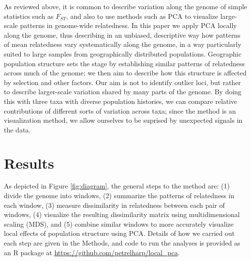 \documentclass[11pt, oneside]{article}   	%
\begin{document}
As reviewed above,
it is common to describe variation along the genome of simple statistics such as $F_{ST}$,
and also to use methods such as PCA to visualize large-scale patterns in genome-wide relatedness.
In this paper we 
apply PCA locally along the genome,
thus describing in an unbiased, descriptive way
how patterns of mean relatedness vary systematically along the genome, 
in a way particularly suited to large samples from geographically distributed populations.
Geographic population structure sets the stage by establishing similar patterns of relatedness across much of the genome;
we then aim to describe how this structure is affected by selection and other factors.
Our aim is not to identify outlier loci,
but rather to describe larger-scale variation shared by many parts of the genome.
By doing this with three taxa with diverse population histories,
we can compare relative contributions of different sorts of variation across taxa;
since the method is an visualization method, 
we allow ourselves to be suprised by unexpected signals in the data.


\section{Results}

As depicted in Figure \ref{fig:diagram}, the general steps to the method are:
(1) divide the genome into windows,
(2) summarize the patterns of relatedness in each window,
(3) measure dissimilarity in relatedness between each pair of windows,
(4) visualize the resulting dissimilarity matrix using multidimensional scaling (MDS),
and (5) combine similar windows to more accurately visualize local effects of population structure using PCA.
Details of how we carried out each step are given in the Methods,
and code to run the analyses is provided as an R package at \url{https://github.com/petrelharp/local_pca}.
\end{document}
